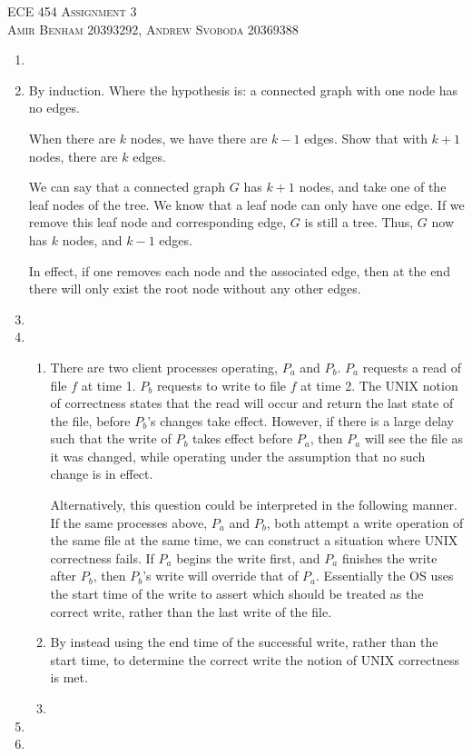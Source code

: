 \documentclass{article}
\begin{document}
\begin{center}
\textsc{\Large ECE 454 Assignment 3}\\[0.5cm]
\textsc{Amir Benham 20393292, Andrew Svoboda 20369388}\\[0.5cm]
\end{center}

\begin{enumerate}

	\item 

	\item 
	By induction. Where the hypothesis is: a connected graph with one node has no edges.
	
	When there are \(k\) nodes, we have there are \(k-1\) edges. Show that with \(k+1\) nodes, there are \(k\) edges. 

	We can say that a connected graph \(G\) has \(k+1\) nodes, and take one of the leaf nodes of the tree. We know that a leaf node can only have one edge. If we remove this leaf node and corresponding edge, \(G\) is still a tree. Thus, \(G\) now has \(k\) nodes, and \(k - 1\) edges.

	In effect, if one removes each node and the associated edge, then at the end there will only exist the root node without any other edges. 

	\item 


	\item 

	\begin{enumerate}
		\item There are two client processes operating, \(P_a\) and \(P_b\). \(P_a\) requests a read of file \(f\) at time 1.  \(P_b\) requests to write to file \(f\) at time 2. The UNIX notion of correctness states that the read will occur and return the last state of the file, before \(P_b\)'s changes take effect. However, if there is a large delay such that the write of \(P_b\) takes effect before \(P_a\), then \(P_a\) will see the file as it was changed, while operating under the assumption that no such change is in effect.

		Alternatively, this question could be interpreted in the following manner. If the same processes above, \(P_a\) and \(P_b\), both attempt a write operation of the same file at the same time, we can construct a situation where UNIX correctness fails. If \(P_a\) begins the write first, and \(P_a\) finishes the write after \(P_b\), then \(P_b\)'s write will override that of \(P_a\). Essentially the OS uses the start time of the write to assert which should be treated as the correct write, rather than the last write of the file. 

		\item By instead using the end time of the successful write, rather than the start time, to determine the correct write the notion of UNIX correctness is met.

		\item
	\end{enumerate}

	\item 

	\item 
\end{enumerate}
\end{document}
